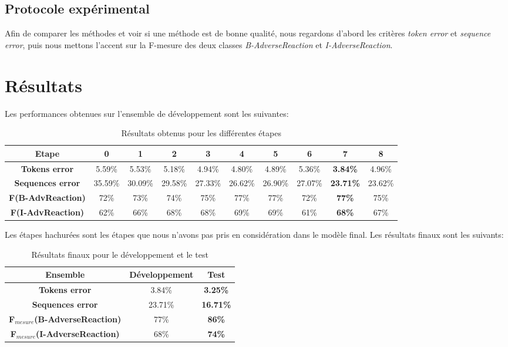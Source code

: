 \documentclass[a4paper,english,11pt]{article}
\begin{document}
\subsection{Protocole expérimental}
Afin de comparer les méthodes et voir si une méthode est de bonne qualité, nous regardons d'abord les critères \emph{token error} et \emph{sequence error}, puis nous mettons l'accent sur la F-mesure des deux classes \emph{B-AdverseReaction} et \emph{I-AdverseReaction}.

\section{Résultats}
Les performances obtenues sur l'ensemble de développement sont les suivantes:

\begin{table}[H]\centering
	\begin{tabular}{cccccccccc}
		\toprule \textbf{Etape} & 0 & 1 & 2 & 3 & 4 & 5 & 6 & 7 & 8\\    \midrule
		\textbf{Tokens error} & 5.59\% & 5.53\%  & 5.18\% & 4.94\% & 4.80\% & 4.89\%  & 5.36\% & \textbf{3.84\%} & 4.96\%  \\
		\textbf{Sequences error} & 35.59\% & 30.09\% & 29.58\% & 27.33\% & 26.62\% & 26.90\%  & 27.07\% & \textbf{23.71\%} & 23.62\%  \\ 
		\textbf{F(B-AdvReaction)} & 72\% & 73\% & 74\% & 75\% & 77\% & 77\%  & 72\% & \textbf{77\%} & 75\%   \\
		\textbf{F(I-AdvReaction)} &   62\% & 66\% & 68\% & 68\% &  69\% & 69\%  & 61\% & \textbf{68\%} & 67\%  \\
		\bottomrule	
	\end{tabular}
	\caption{Résultats obtenus pour les différentes étapes\label{}}
\end{table}

Les étapes hachurées sont les étapes que nous n'avons pas pris en considération dans le modèle final. Les résultats finaux sont les suivants:

\begin{table}[H]\centering
	\begin{tabular}{ccc}
		\toprule \textbf{Ensemble} & Développement & \textbf{Test}\\    \midrule
		\textbf{Tokens error} & 3.84\% & \textbf{3.25\%}  \\
		\textbf{Sequences error} & 23.71\% & \textbf{16.71\%} \\
		\textbf{F$_{mesure}$(B-AdverseReaction)} & 77\% & \textbf{86\%}\\
		\textbf{F$_{mesure}$(I-AdverseReaction)} &   68\% & \textbf{74\%} \\
		\bottomrule	
	\end{tabular}
	\caption{Résultats finaux pour le développement et le test}
\end{table}
\end{document}
